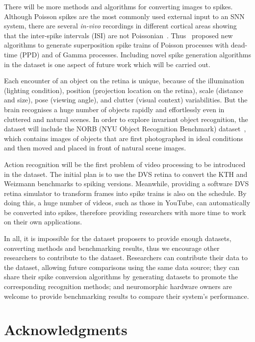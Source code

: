 \documentclass{frontiersENG} %
\begin{document}
There will be more methods and algorithms for converting images to spikes.
Although Poisson spikes are the most commonly used external input to an SNN system, there are several \textit{in-vivo} recordings in different cortical areas showing that the inter-spike intervals (ISI) are not Poissonian~\citep{deger2012statistical}. 
Thus~\citet{deger2012statistical} proposed new algorithms to generate superposition spike trains of Poisson processes with dead-time (PPD) and of Gamma processes.
Including novel spike generation algorithms in the dataset is one aspect of future work which will be carried out.

Each encounter of an object on the retina is unique, because of the illumination (lighting condition), position (projection location on the retina), scale (distance and size), pose (viewing angle), and clutter (visual context) variabilities.
But the brain recognises a huge number of objects rapidly and effortlessly even in cluttered and natural scenes.
In order to explore invariant object recognition, the dataset will include the NORB (NYU Object Recognition Benchmark) dataset~\citep{lecun2004learning}, which contains images of objects that are first photographed in ideal conditions and then moved and placed in front of natural scene images.

Action recognition will be the first problem of video processing to be introduced in the dataset.
The initial plan is to use the DVS retina to convert the KTH and Weizmann benchmarks to spiking versions.
Meanwhile, providing a software DVS retina simulator to transform frames into spike trains is also on the schedule.
By doing this, a huge number of videos, such as those in YouTube, can automatically be converted into spikes, therefore providing researchers with more time to work on their own applications.

In all, it is impossible for the dataset proposers to provide enough datasets, converting methods and benchmarking results, thus we encourage other researchers to contribute to the dataset.
Researchers can contribute their data to the dataset, allowing future comparisons using the same data source;
they can share their spike conversion algorithms by generating datasets to promote the corresponding recognition methods;
and neuromorphic hardware owners are welcome to provide benchmarking results to compare their system's performance.

\section*{Acknowledgments}
\end{document}
